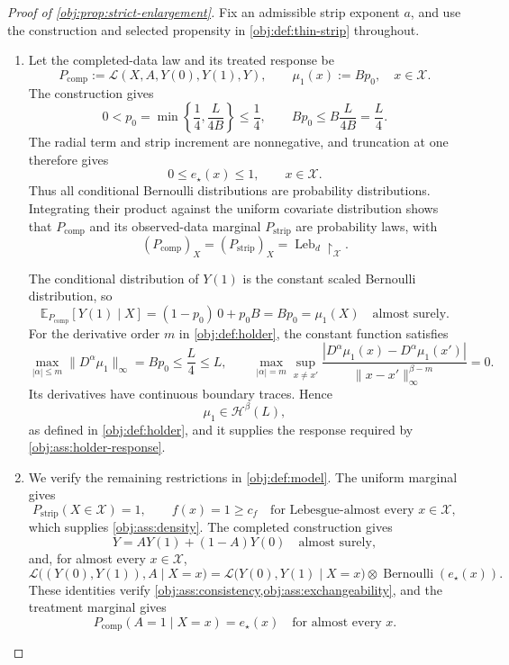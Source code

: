 \begin{proof}[Proof of \cref{obj:prop:strict-enlargement}]
Fix an admissible strip exponent \(a\), and use the construction and selected propensity in \cref{obj:def:thin-strip} throughout.

\begin{enumerate}
\item Let the completed-data law and its treated response be
\[
P_{\mathrm{comp}}
:=
\mathcal L(X,A,Y(0),Y(1),Y),
\qquad
\mu_1(x):=Bp_0,\quad x\in\mathcal X.
\]
The construction gives
\[
0<p_0=\min\left\{\frac14,\frac{L}{4B}\right\}\le\frac14,
\qquad
Bp_0\le B\frac{L}{4B}=\frac L4.
\]
The radial term and strip increment are nonnegative, and truncation at one therefore gives
\[
0\le e_\star(x)\le1,\qquad x\in\mathcal X.
\]
Thus all conditional Bernoulli distributions are probability distributions. Integrating their product against the uniform covariate distribution shows that \(P_{\mathrm{comp}}\) and its observed-data marginal \(P_{\mathrm{strip}}\) are probability laws, with
\[
(P_{\mathrm{comp}})_X=(P_{\mathrm{strip}})_X
=\operatorname{Leb}_d\!\restriction_{\mathcal X}.
\]

The conditional distribution of \(Y(1)\) is the constant scaled Bernoulli distribution, so
\[
\mathbb E_{P_{\mathrm{comp}}}[Y(1)\mid X]
=(1-p_0)\,0+p_0B
=Bp_0
=\mu_1(X)
\quad\text{almost surely}.
\]
For the derivative order \(m\) in \cref{obj:def:holder}, the constant function satisfies
\[
\max_{|\alpha|\le m}\|D^\alpha\mu_1\|_\infty
=Bp_0\le\frac L4\le L,
\qquad
\max_{|\alpha|=m}\sup_{x\ne x'}
\frac{|D^\alpha\mu_1(x)-D^\alpha\mu_1(x')|}
{\|x-x'\|_\infty^{\beta-m}}
=0.
\]
Its derivatives have continuous boundary traces. Hence
\[
\mu_1\in\mathcal H^\beta(L),
\]
as defined in \cref{obj:def:holder}, and it supplies the response required by \cref{obj:ass:holder-response}.

\item We verify the remaining restrictions in \cref{obj:def:model}. The uniform marginal gives
\[
P_{\mathrm{strip}}(X\in\mathcal X)=1,
\qquad
f(x)=1\ge c_f
\quad\text{for Lebesgue-almost every }x\in\mathcal X,
\]
which supplies \cref{obj:ass:density}. The completed construction gives
\[
Y=AY(1)+(1-A)Y(0)
\quad\text{almost surely},
\]
and, for almost every \(x\in\mathcal X\),
\[
\mathcal L\bigl((Y(0),Y(1)),A\mid X=x\bigr)
=
\mathcal L\bigl(Y(0),Y(1)\mid X=x\bigr)
\otimes\operatorname{Bernoulli}(e_\star(x)).
\]
These identities verify \cref{obj:ass:consistency,obj:ass:exchangeability}, and the treatment marginal gives
\[
P_{\mathrm{comp}}(A=1\mid X=x)=e_\star(x)
\quad\text{for almost every }x.
\]


\end{enumerate}
\end{proof}
